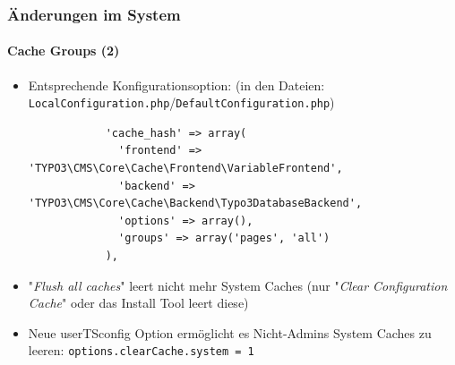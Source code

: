 \begin{frame}[fragile]
	\frametitle{Änderungen im System}
	\framesubtitle{Cache Groups (2)}

	\lstset{
		basicstyle=\tiny\ttfamily
	}

	\begin{itemize}

		\item Entsprechende Konfigurationsoption:\newline
			\smaller(in den Dateien: \texttt{LocalConfiguration.php}/\texttt{DefaultConfiguration.php})\normalsize

			\begin{lstlisting}
			'cache_hash' => array(
			  'frontend' => 'TYPO3\CMS\Core\Cache\Frontend\VariableFrontend',
			  'backend' => 'TYPO3\CMS\Core\Cache\Backend\Typo3DatabaseBackend',
			  'options' => array(),
			  'groups' => array('pages', 'all')
			),
			\end{lstlisting}

		\item "\textit{Flush all caches}" leert nicht mehr System Caches\newline
			\small(nur "\textit{Clear Configuration Cache}" oder das Install Tool leert diese)\normalsize
		\item Neue userTSconfig Option ermöglicht es Nicht-Admins System Caches zu leeren:\newline
			\smaller\texttt{options.clearCache.system = 1}\normalsize

		\breakingchange

	\end{itemize}

\end{frame}


